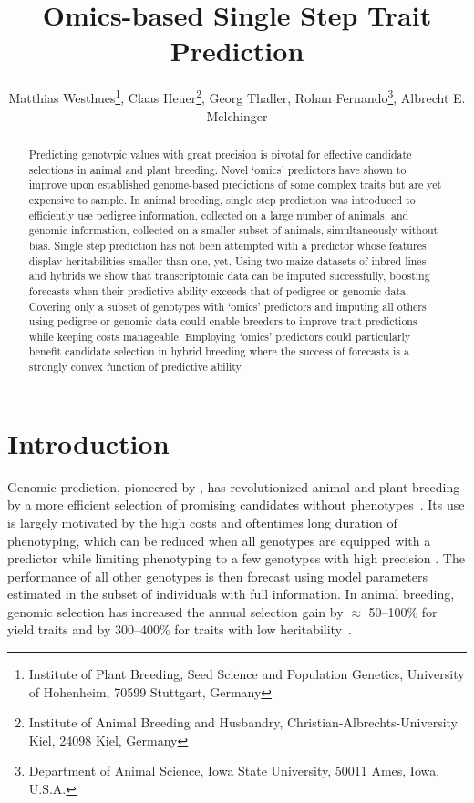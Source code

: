 \documentclass[12pt,titlepage]{article}
\title{Omics-based Single Step Trait Prediction}
\author{
  Matthias Westhues\thanks{Institute of Plant Breeding, Seed Science and Population Genetics, University of Hohenheim, 70599 Stuttgart, Germany},
  Claas Heuer\thanks{Institute of Animal Breeding and Husbandry, Christian-Albrechts-University Kiel, 24098 Kiel, Germany},
  Georg Thaller\samethanks[2],
  Rohan Fernando\thanks{Department of Animal Science, Iowa State University, 50011 Ames, Iowa, U.S.A.},
  Albrecht E. Melchinger\samethanks[1]
}
\begin{document}
\maketitle
\doublespacing
\linenumbers



\begin{abstract}
Predicting genotypic values with great precision is pivotal for effective
candidate selections in animal and plant breeding.
Novel `omics' predictors have shown to improve upon established genome-based
predictions of some complex traits but are yet expensive to sample.
In animal breeding, single step prediction was introduced to efficiently use
pedigree information, collected on a large number of animals, and genomic
information, collected on a smaller subset of animals, simultaneously without
bias.
Single step prediction has not been attempted with a predictor whose features
display heritabilities smaller than one, yet.
Using two maize datasets of inbred lines and hybrids we show that transcriptomic
data can be imputed successfully, boosting forecasts when their predictive
ability exceeds that of pedigree or genomic data.
Covering only a subset of genotypes with `omics' predictors and imputing all
others using pedigree or genomic data could enable breeders to improve trait
predictions while keeping costs manageable.
Employing `omics' predictors could particularly benefit candidate selection in
hybrid breeding where the success of forecasts is a strongly convex function of
predictive ability.
\end{abstract}




\section{Introduction}
Genomic prediction, pioneered by , has revolutionized
animal and plant breeding by a more efficient selection of promising candidates 
without phenotypes~\cite{DeLosCampos2013,Garcia-Ruiz2016}.
Its use is largely motivated by the high costs and oftentimes long duration of 
phenotyping, which can be reduced when all genotypes are equipped with a predictor 
while limiting phenotyping to a few genotypes with high precision
\cite{Kadam2016}.
The performance of all other genotypes is then forecast using model parameters
estimated in the subset of individuals with full information.
In animal breeding, genomic selection has increased the annual selection gain 
by $\approx$ 50--100\% for yield traits and by 300--400\% for traits with low 
heritability~\cite{Garcia-Ruiz2016}.
\end{document}
